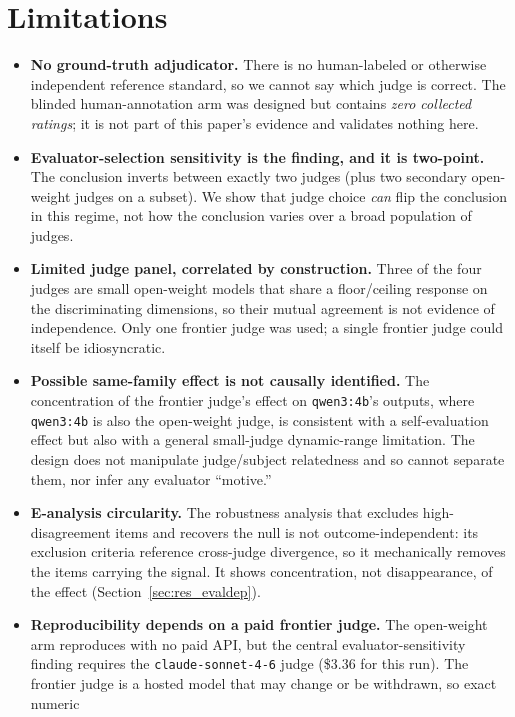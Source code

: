 \section{Limitations}
\label{sec:limitations}

\begin{itemize}
\item \textbf{No ground-truth adjudicator.} There is no human-labeled or otherwise
independent reference standard, so we cannot say which judge is correct. The
blinded human-annotation arm was designed but contains \emph{zero collected
ratings}; it is not part of this paper's evidence and validates nothing here.
\item \textbf{Evaluator-selection sensitivity is the finding, and it is
two-point.} The conclusion inverts between exactly two judges (plus two secondary
open-weight judges on a subset). We show that judge choice \emph{can} flip the
conclusion in this regime, not how the conclusion varies over a broad population
of judges.
\item \textbf{Limited judge panel, correlated by construction.} Three of the four
judges are small open-weight models that share a floor/ceiling response on the
discriminating dimensions, so their mutual agreement is not evidence of
independence. Only one frontier judge was used; a single frontier judge could
itself be idiosyncratic.
\item \textbf{Possible same-family effect is not causally identified.} The
concentration of the frontier judge's effect on \texttt{qwen3:4b}'s outputs,
where \texttt{qwen3:4b} is also the open-weight judge, is consistent with a
self-evaluation effect but also with a general small-judge dynamic-range
limitation. The design does not manipulate judge/subject relatedness and so
cannot separate them, nor infer any evaluator ``motive.''
\item \textbf{E-analysis circularity.} The robustness analysis that excludes
high-disagreement items and recovers the null is not outcome-independent: its
exclusion criteria reference cross-judge divergence, so it mechanically removes
the items carrying the signal. It shows concentration, not disappearance, of the
effect (Section~\ref{sec:res_evaldep}).
\item \textbf{Reproducibility depends on a paid frontier judge.} The open-weight
arm reproduces with no paid API, but the central evaluator-sensitivity finding
requires the \texttt{claude-sonnet-4-6} judge (\$3.36 for this run). The frontier
judge is a hosted model that may change or be withdrawn, so exact numeric

\end{itemize}
